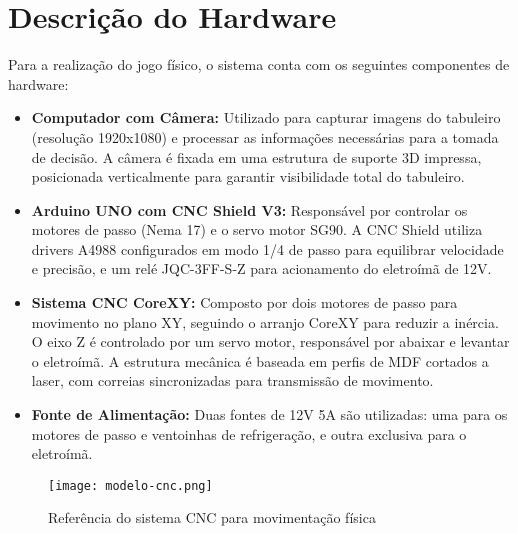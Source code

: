\documentclass[a4paper,12pt]{article}
\begin{document}
\section{Descrição do Hardware}
Para a realização do jogo físico, o sistema conta com os seguintes componentes de hardware:
\begin{itemize}
    \item \textbf{Computador com Câmera:} Utilizado para capturar imagens do tabuleiro (resolução 1920x1080) e processar as informações necessárias para a tomada de decisão. A câmera é fixada em uma estrutura de suporte 3D impressa, posicionada verticalmente para garantir visibilidade total do tabuleiro.
    \item \textbf{Arduino UNO com CNC Shield V3:} Responsável por controlar os motores de passo (Nema 17) e o servo motor SG90. A CNC Shield utiliza drivers A4988 configurados em modo 1/4 de passo para equilibrar velocidade e precisão, e um relé JQC-3FF-S-Z para acionamento do eletroímã de 12V.
    \item \textbf{Sistema CNC CoreXY:} Composto por dois motores de passo para movimento no plano XY, seguindo o arranjo CoreXY para reduzir a inércia. O eixo Z é controlado por um servo motor, responsável por abaixar e levantar o eletroímã. A estrutura mecânica é baseada em perfis de MDF cortados a laser, com correias sincronizadas para transmissão de movimento.
    \item \textbf{Fonte de Alimentação:} Duas fontes de 12V 5A são utilizadas: uma para os motores de passo e ventoinhas de refrigeração, e outra exclusiva para o eletroímã.
\end{itemize}

\begin{figure}[H]
    \centering
    \texttt{[image: modelo-cnc.png]} %
    \caption{Referência do sistema CNC para movimentação física}
    \label{fig:modelo_cnc}
\end{figure}
\end{document}
